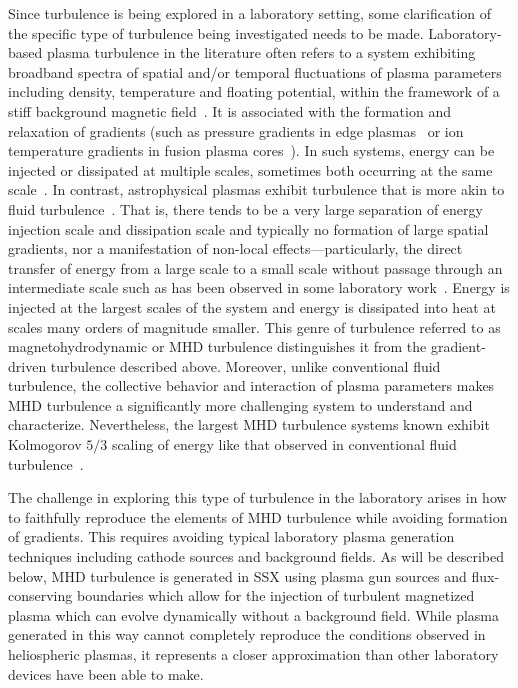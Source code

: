 \documentclass[aip,pop,amsmath,amssymb,preprint,superscriptaddress]{revtex4-1} %
\begin{document}
Since turbulence is being explored in a laboratory setting, some clarification of the specific type of turbulence being investigated needs to be made. Laboratory-based plasma turbulence in the literature often refers to a system exhibiting broadband spectra of spatial and/or temporal fluctuations of plasma parameters including density, temperature and floating potential, within the framework of a stiff background magnetic field~\cite{brown2014}. It is associated with the formation and relaxation of gradients (such as pressure gradients in edge plasmas~\cite{zweben2007} or ion temperature gradients in fusion plasma cores~\cite{ghim2014}). In such systems, energy can be injected or dissipated at multiple scales, sometimes both occurring at the same scale~\cite{hatch2011}. In contrast, astrophysical plasmas exhibit turbulence that is more akin to fluid turbulence~\cite{goldstein1995}. That is, there tends to be a very large separation of energy injection scale and dissipation scale and typically no formation of large spatial gradients, nor a manifestation of non-local effects---particularly, the direct transfer of energy from a large scale to a small scale without passage through an intermediate scale such as has been observed in some laboratory work~\cite{moser2012}. Energy is injected at the largest scales of the system and energy is dissipated into heat at scales many orders of magnitude smaller. This genre of turbulence referred to as magnetohydrodynamic or MHD turbulence distinguishes it from the gradient-driven turbulence described above. Moreover, unlike conventional fluid turbulence, the collective behavior and interaction of plasma parameters makes MHD turbulence a significantly more challenging system to understand and characterize. Nevertheless, the largest MHD turbulence systems known exhibit Kolmogorov $5/3$ scaling of energy like that observed in conventional fluid turbulence~\cite{sahraoui2009,frisch1995}. 

The challenge in exploring this type of turbulence in the laboratory arises in how to faithfully reproduce the elements of MHD turbulence while avoiding formation of gradients. This requires avoiding typical laboratory plasma generation techniques including cathode sources and background fields. As will be described below, MHD turbulence is generated in SSX using plasma gun sources and flux-conserving boundaries which allow for the injection of turbulent magnetized plasma which can evolve dynamically without a background field. While plasma generated in this way cannot completely reproduce the conditions observed in heliospheric plasmas, it represents a closer approximation than other laboratory devices have been able to make.
\end{document}
